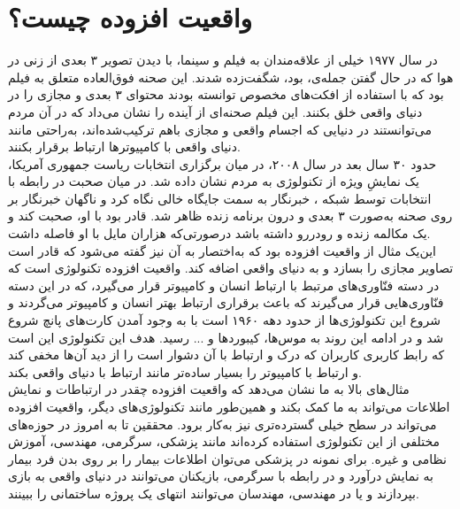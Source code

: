 \section{واقعیت افزوده چیست؟}
در سال ۱۹۷۷ خیلی از علاقه‌مندان به فیلم و سینما، با دیدن تصویر ۳ بعدی از زنی در هوا که در حال گفتن جمله‌ی،   بود، شگفت‌زده شدند. این صحنه فوق‌العاده متعلق به فیلم  بود که با استفاده از افکت‌های مخصوص توانسته بودند محتوای ۳ بعدی و مجازی را در دنیای واقعی خلق بکنند. این فیلم صحنه‌ای از آینده را نشان می‌داد که در آن مردم می‌توانستند در دنیایی که اجسام واقعی و مجازی باهم ترکیب‌شده‌اند، به‌راحتی مانند دنیای واقعی با کامپیوترها ارتباط برقرار بکنند.
\\
حدود ۳۰ سال بعد در سال ۲۰۰۸، در میان برگزاری انتخابات ریاست جمهوری آمریکا، یک نمایشِ ویژه از تکنولوژی به مردم نشان داده شد. در میان صحبت در رابطه با انتخابات توسط شبکه ، خبرنگار به سمت جایگاه خالی نگاه کرد و ناگهان خبرنگار  بر روی صحنه به‌صورت ۳ بعدی و درون برنامه زنده ظاهر شد.  قادر بود با او، صحبت کند و یک مکالمه زنده و رودررو داشته باشد درصورتی‌که   هزاران مایل با او فاصله داشت.
\\
این‌یک مثال از واقعیت افزوده بود  که به‌اختصار به آن  نیز گفته می‌شود که قادر است تصاویر مجازی را بسازد و به دنیای واقعی اضافه کند. واقعیت افزوده تکنولوژی است که در دسته فنّاوری‌های مرتبط با ارتباط انسان و کامپیوتر  قرار می‌گیرد، که در این دسته فنّاوری‌هایی قرار می‌گیرند که باعث برقراری ارتباط  بهتر انسان و کامپیوتر می‌گردند و شروع این تکنولوژی‌ها از حدود دهه ۱۹۶۰ است با به وجود آمدن کارت‌های پانچ شروع شد و در ادامه این روند به موس‌ها، کیبوردها و ... رسید. هدف این تکنولوژی این است که رابط کاربری  کاربران که درک و ارتباط با آن دشوار است را از دید آن‌ها مخفی کند و ارتباط با کامپیوتر را بسیار ساده‌تر مانند ارتباط با دنیای واقعی بکند.
\\
مثال‌های بالا به ما نشان می‌دهد که واقعیت افزوده چقدر در ارتباطات و نمایش اطلاعات می‌تواند به ما کمک بکند و همین‌طور مانند تکنولوژی‌های دیگر، واقعیت افزوده می‌تواند در سطح خیلی گسترده‌تری نیز به‌کار برود. محققین تا به امروز در حوزه‌های مختلفی از این تکنولوژی استفاده کرده‌اند مانند پزشکی، سرگرمی، مهندسی، آموزش نظامی و غیره. برای نمونه در پزشکی می‌توان اطلاعات بیمار را بر روی بدن فرد بیمار به نمایش درآورد \cite{nasir}و در رابطه با سرگرمی، بازیکنان می‌توانند در دنیای واقعی به بازی بپردازند \cite{Piekarski}و یا در مهندسی، مهندسان می‌توانند انتهای یک پروژه ساختمانی را ببینند\cite{Fjeld}.
\\


